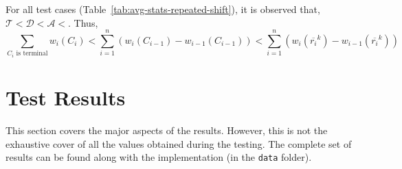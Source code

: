 For all test cases (Table~\ref{tab:avg-stats-repeated-shift}), it is observed that, $\mathcal{T} < \mathcal{D} < \mathcal{A} < $. Thus, 
$$\sum_{C_i\text{ is terminal}} w_i(C_i) < \sum_{i=1}^{n} (w_i(C_{i-1}) - w_{i-1}(C_{i-1})) < \sum_{i=1}^{n} (w_i(\overline{r_i}^k) - w_{i-1}(\overline{r_i}^k))$$

\section{Test Results}\label{sec:results}

This section covers the major aspects of the results. However, this is not the exhaustive cover of all the values obtained during the testing. The complete set of results can be found along with the implementation (in the \texttt{data} folder).






